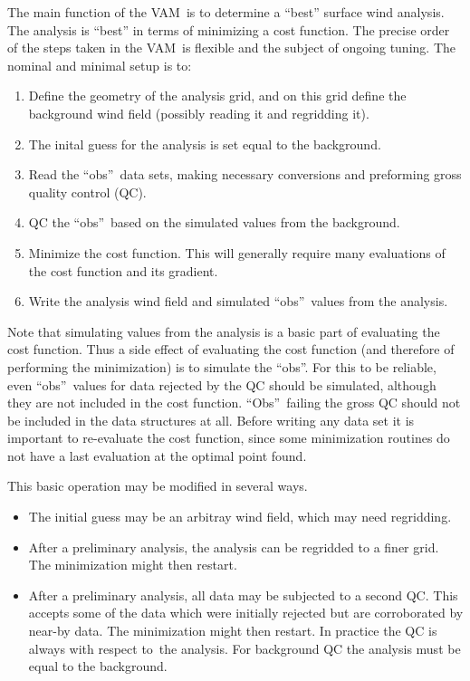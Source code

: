 \documentclass[11pt]{article}
\newcommand{\Obs}{``Obs''}
\newcommand{\obs}{``obs''}
\newcommand{\vam}{VAM}
\newcommand{\wrt}{with respect to}
\begin{document}
The main function of the \vam\ is to determine a ``best'' surface wind
analysis.  The analysis is ``best'' in terms of minimizing a cost
function.  The precise order of the steps taken in the \vam\ is
flexible and the subject of ongoing tuning.  The nominal and minimal
setup is to:
 \begin{enumerate}
  \item Define the geometry of the analysis grid, and on this grid
define the background wind field (possibly reading it and regridding it).
  \item The inital guess for the analysis is set equal to the
background.
  \item Read the \obs\ data sets, making necessary conversions and
preforming gross quality control (QC). 
  \item QC the \obs\ based on the simulated values from the background.
  \item Minimize the cost function.  This will generally require many
evaluations of the cost function and its gradient.
  \item Write the analysis wind field and simulated \obs\ values from
the analysis.
 \end{enumerate}

Note that simulating values from the analysis is a basic part of
evaluating the cost function.  Thus a side effect of evaluating the
cost function (and therefore of performing the minimization) is to
simulate the \obs.  For this to be reliable, even \obs\ values for
data rejected by the QC should be simulated, although they are not
included in the cost function.
 \Obs\ failing the gross QC should not be included in the data
structures at all.
 Before writing any data set it is important to re-evaluate the cost
function, since some minimization routines do not have a last
evaluation at the optimal point found.

This basic operation may be modified in several ways.
 \begin{itemize}
  \item The initial guess may be an arbitray wind field, which may
need regridding.
  \item After a preliminary analysis, the analysis can be regridded to
a finer grid.  The minimization might then restart.
  \item After a preliminary analysis, all data may be subjected to a
second QC.  This accepts some of the data which were initially rejected
but are corroborated by near-by data.  The minimization might then
restart.  In practice the QC is always \wrt\ the analysis.  For
background QC the analysis must be equal to the background.
 \end{itemize}
\end{document}
